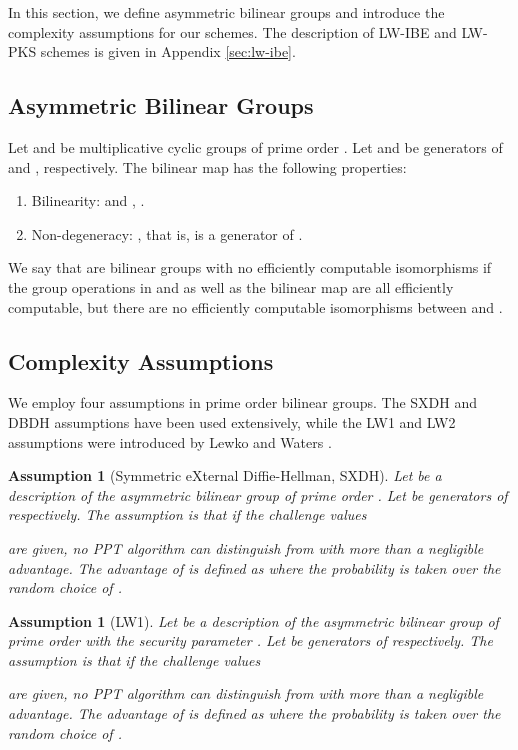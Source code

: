 \documentclass[11pt,letterpaper]{article}
\newtheorem{assumption}[theorem]{Assumption}
\begin{document}
In this section, we define asymmetric bilinear groups and introduce the
complexity assumptions for our schemes. The description of LW-IBE and LW-PKS
schemes is given in Appendix \ref{sec:lw-ibe}.

\subsection{Asymmetric Bilinear Groups}

Let  and  be multiplicative cyclic groups of prime
order . Let  and  be generators of  and ,
respectively. The bilinear map 
has the following properties:
\begin{enumerate}
\item Bilinearity:  and
    , .
\item Non-degeneracy: , that is,  is a
    generator of .
\end{enumerate}
We say that  are bilinear groups with no efficiently
computable isomorphisms if the group operations in  and 
as well as the bilinear map  are all efficiently computable, but there are
no efficiently computable isomorphisms between  and .

\subsection{Complexity Assumptions}

We employ four assumptions in prime order bilinear groups. The SXDH and DBDH
assumptions have been used extensively, while the LW1 and LW2 assumptions
were introduced by Lewko and Waters \cite{LewkoW10}.

\begin{assumption}[Symmetric eXternal Diffie-Hellman, SXDH]
Let  be a description of the asymmetric bilinear
group of prime order . Let  be generators of 
respectively. The assumption is that if the challenge values
    
are given, no PPT algorithm  can distinguish 
from  with more than a negligible advantage. The
advantage of  is defined as  where the probability is
taken over the random choice of .
\end{assumption}

\begin{assumption}[LW1]
Let  be a description of the asymmetric bilinear
group of prime order  with the security parameter . Let  be generators of  respectively. The assumption is that
if the challenge values
    
are given, no PPT algorithm  can distinguish  from  with more than a negligible advantage. The
advantage of  is defined as  where the probability is
taken over the random choice of .
\end{assumption}
\end{document}
